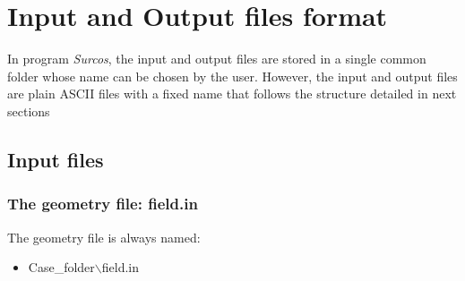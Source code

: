 \chapter{Input and Output files format}

In program \emph{Surcos}, the input and output files are stored in a single common folder whose name
can be chosen by the user. However, the input and output files are plain ASCII files with a fixed name
that follows the structure detailed in next sections


\section{Input files}

\subsection{The geometry file: field.in}

The geometry file is always named:
\begin{itemize}
\item Case\_folder$\backslash$field.in
\end{itemize}

